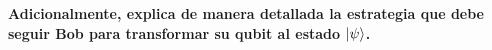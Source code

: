 \textbf{Adicionalmente, explica de manera detallada la estrategia que debe seguir Bob para
transformar su qubit al estado $\ket{\psi}$.}\vspace{.2cm}

\textcolor{bibi}{}
\begin{quote}
\end{quote}
